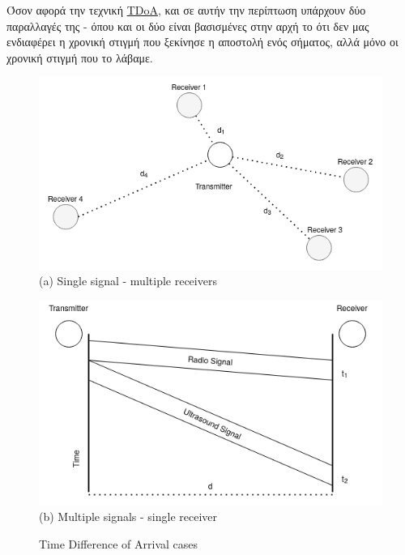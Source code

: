 Όσον αφορά την τεχνική \hyperref[abbr:TDoA]{TDoA}, και σε αυτήν την περίπτωση υπάρχουν δύο παραλλαγές της \cite{wsn-Localization-systems} - όπου και οι 
δύο είναι βασισμένες στην αρχή το ότι δεν μας ενδιαφέρει η χρονική στιγμή που ξεκίνησε η αποστολή ενός σήματος, αλλά μόνο
οι χρονική στιγμή που το λάβαμε.

\begin{figure} [H]
    \centering
    \begin{minipage}{.5\textwidth}
      \centering
      \includegraphics[width=\linewidth]{../Photos/tdoa-multiple.png}
      {(a) Single signal - multiple receivers}
    \end{minipage}%
    \begin{minipage}{.5\textwidth}
      \centering
      \includegraphics[width=\linewidth]{../Photos/tdoa-timing.png}
      {(b) Multiple signals - single receiver}
    \end{minipage}
    \hfill \break
    \decoRule
    \caption[Time Difference of Arrival cases]{Time Difference of Arrival cases}
    \label{fig:Time-Difference-of-Arrival-cases}
\end{figure}


